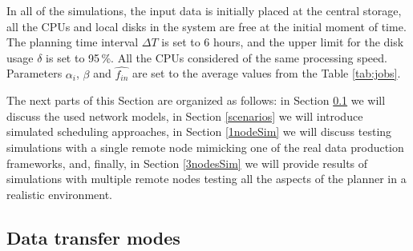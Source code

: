 \documentclass{svjour3}                     %
\begin{document}
In all of the simulations, the input data is initially placed at the central storage, all the CPUs and local disks in the system are free at the initial moment of time. The planning time interval $\Delta T$ is set to 6 hours, and the upper limit for the disk usage $\delta$ is set to 95\,\%. All the CPUs considered of the same processing speed. Parameters $\alpha_{i}$, $\beta$ and $\widehat{f_{in}}$ are set to the average values from the Table \ref{tab:jobs}.

The next parts of this Section are organized as follows: in Section \ref{network} we will discuss the used network models, in Section \ref{scenarios} we will introduce simulated scheduling approaches, in Section \ref{1nodeSim} we will discuss testing simulations with a single remote node mimicking one of the real data production frameworks, and, finally, in Section \ref{3nodesSim} we will provide results of simulations with multiple remote nodes testing all the aspects of the planner in a realistic environment.


\subsection{Data transfer modes}
\label{network}
\end{document}
